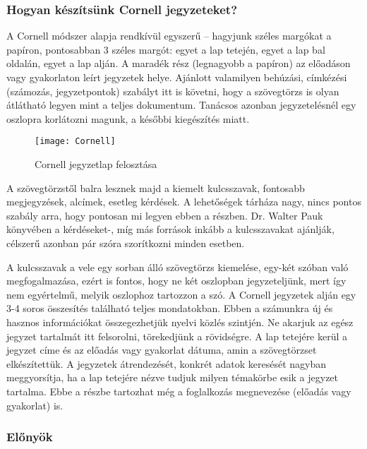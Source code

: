 \documentclass[../Main.tex]{subfiles}
\begin{document}
\subsubsection{Hogyan készítsünk Cornell jegyzeteket?}

A Cornell módszer alapja rendkívül
egyszerű – hagyjunk széles margókat a
papíron, pontosabban 3 széles margót: egyet a
lap tetején, egyet a lap bal oldalán, egyet a lap
alján. A maradék rész (legnagyobb a papíron)
az előadáson vagy gyakorlaton leírt jegyzetek
helye. Ajánlott valamilyen behúzási,
címkézési (számozás, jegyzetpontok) szabályt
itt is követni, hogy a szövegtörzs is olyan
átlátható legyen mint a teljes dokumentum.
Tanácsos azonban jegyzetelésnél egy oszlopra
korlátozni magunk, a későbbi kiegészítés
miatt.

\newpage
\begin{wrapfigure}{r}{0.5\textwidth}
    \centering
    \texttt{[image: Cornell]}
    \caption{Cornell jegyzetlap felosztása}
\end{wrapfigure}
    
A szövegtörzstől balra lesznek majd a
kiemelt kulcsszavak, fontosabb megjegyzések,
alcímek, esetleg kérdések. A lehetőségek
tárháza nagy, nincs pontos szabály arra, hogy
pontosan mi legyen ebben a részben. Dr. Walter
Pauk könyvében a kérdéseket-, míg más források 
inkább a kulcsszavakat ajánlják, célszerű azonban
pár szóra szorítkozni minden esetben.



A kulcsszavak a vele egy sorban álló szövegtörzs kiemelése, egy-két szóban való
megfogalmazása, ezért is fontos, hogy ne két oszlopban jegyzeteljünk, mert így nem
egyértelmű, melyik oszlophoz tartozzon a szó.
 A Cornell jegyzetek alján egy 3-4 soros összesítés található teljes mondatokban. Ebben
a számunkra új és hasznos információkat összegezhetjük nyelvi közlés szintjén. Ne
akarjuk az egész jegyzet tartalmát itt felsorolni, törekedjünk a rövidségre.
A lap tetejére kerül a jegyzet címe és az előadás vagy gyakorlat dátuma, amin a
szövegtörzset elkészítettük. A jegyzetek átrendezését, konkrét adatok keresését nagyban
meggyorsítja, ha a lap tetejére nézve tudjuk milyen témakörbe esik a jegyzet tartalma.
Ebbe a részbe tartozhat még a foglalkozás megnevezése (előadás vagy gyakorlat) is.


\subsubsection{Előnyök}
\end{document}
